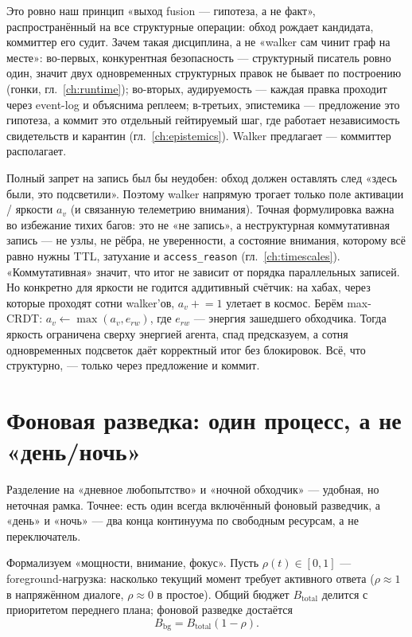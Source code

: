 Это ровно наш принцип «выход fusion --- гипотеза, а не факт»,
распространённый на все структурные операции: обход рождает кандидата,
коммиттер его судит. Зачем такая дисциплина, а не «walker сам чинит граф на
месте»: во-первых, конкурентная безопасность --- структурный писатель ровно
один, значит двух одновременных структурных правок не бывает по построению
(гонки, гл.~\ref{ch:runtime}); во-вторых, аудируемость --- каждая правка проходит
через event-log и объяснима реплеем; в-третьих, эпистемика --- предложение это
гипотеза, а коммит это отдельный гейтируемый шаг, где работает независимость
свидетельств и карантин (гл.~\ref{ch:epistemics}). Walker предлагает ---
коммиттер располагает.

\begin{intuition}
Полный запрет на запись был бы неудобен: обход должен оставлять след «здесь
были, это подсветили». Поэтому walker напрямую трогает только поле активации /
яркости $a_v$ (и связанную телеметрию внимания). Точная формулировка важна во
избежание тихих багов: это не «не запись», а неструктурная коммутативная
запись --- не узлы, не рёбра, не уверенности, а состояние внимания, которому
всё равно нужны TTL, затухание и \texttt{access\_reason} (гл.~\ref{ch:timescales}).
«Коммутативная» значит, что итог не зависит от порядка параллельных записей.
Но конкретно для яркости не годится аддитивный счётчик: на хабах, через которые
проходят сотни walker'ов, $a_v \mathrel{+}= 1$ улетает в космос. Берём max-CRDT:
$a_v \leftarrow \max(a_v, e_{rw})$, где $e_{rw}$ --- энергия зашедшего обходчика.
Тогда яркость ограничена сверху энергией агента, спад предсказуем, а сотня
одновременных подсветок даёт корректный итог без блокировок. Всё, что
структурно, --- только через предложение и коммит.
\end{intuition}

\section{Фоновая разведка: один процесс, а не «день/ночь»}
\label{sec:background}

Разделение на «дневное любопытство» и «ночной обходчик» --- удобная, но
неточная рамка. Точнее: есть один всегда включённый фоновый разведчик, а
«день» и «ночь» --- два конца континуума по свободным ресурсам, а не
переключатель.

Формализуем «мощности, внимание, фокус». Пусть $\rho(t) \in [0, 1]$ ---
foreground-нагрузка: насколько текущий момент требует активного ответа
($\rho \approx 1$ в напряжённом диалоге, $\rho \approx 0$ в простое). Общий
бюджет $B_{\text{total}}$ делится с приоритетом переднего плана; фоновой
разведке достаётся
\[
B_{\text{bg}} = B_{\text{total}} (1 - \rho).
\]

